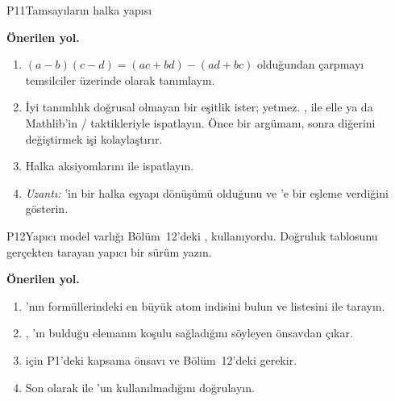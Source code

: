 \begin{projekarti}{P11}{Tamsayıların halka yapısı}

\textbf{Önerilen yol.}
\begin{enumerate}[nosep]
  \item $(a - b)(c - d) = (ac + bd) - (ad + bc)$ olduğundan çarpmayı
        temsilciler üzerinde  olarak tanımlayın.
  \item İyi tanımlılık doğrusal olmayan bir eşitlik ister; 
        yetmez. ,  ile elle ya da Mathlib'in
        / taktikleriyle ispatlayın.
        Önce bir argümanı, sonra diğerini değiştirmek işi kolaylaştırır.
  \item Halka aksiyomlarını  ile ispatlayın.
  \item \emph{Uzantı:} 'in bir halka eşyapı dönüşümü
        olduğunu ve 'e bir eşleme verdiğini gösterin.
\end{enumerate}
\end{projekarti}

\begin{projekarti}{P12}{Yapıcı model varlığı}
Bölüm~12'deki ,  kullanıyordu.
Doğruluk tablosunu gerçekten tarayan yapıcı bir sürüm yazın.


\textbf{Önerilen yol.}
\begin{enumerate}[nosep]
  \item {}'nın formüllerindeki en büyük atom indisini bulun ve
         listesini  ile tarayın.
  \item {}, 'ın bulduğu elemanın koşulu
        sağladığını söyleyen önsavdan çıkar.
  \item {} için P1'deki kapsama önsavı ve Bölüm~12'deki
         gerekir.
  \item Son olarak   ile 'un
        kullanılmadığını doğrulayın.
\end{enumerate}
\end{projekarti}

